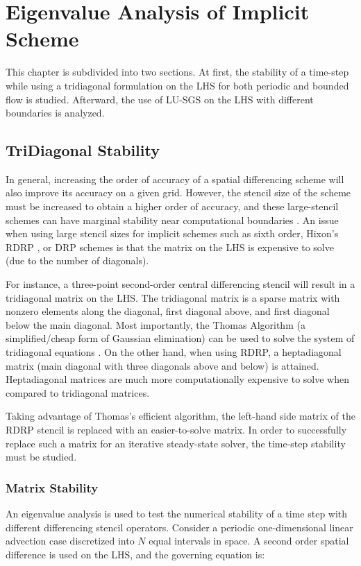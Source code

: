 \documentclass[conf]{new-aiaa}
\begin{document}
\section{Eigenvalue Analysis of Implicit Scheme}
\label{sec:Eigenvalue}
This chapter is subdivided into two sections. 
At first, the stability of a time-step while using a tridiagonal formulation on the LHS for both periodic and bounded flow is studied. 
Afterward, the use of LU-SGS on the LHS with different boundaries is analyzed. 

\subsection{TriDiagonal Stability}
\label{subsec:TriDi}
In general, increasing the order of accuracy of a spatial differencing scheme will also improve its accuracy on a given grid. 
However, the stencil size of the scheme must be increased to obtain a higher order of accuracy, and these large-stencil schemes can have marginal stability near computational boundaries \cite{RDRP}. 
An issue when using large stencil sizes for implicit schemes such as sixth order, Hixon's RDRP \cite{RDRP}, or DRP \cite{DRP} schemes is that the matrix on the LHS is expensive to solve (due to the number of diagonals). 

For instance, a three-point second-order central differencing stencil will result in a tridiagonal matrix on the LHS. 
The tridiagonal matrix is a sparse matrix with nonzero elements along the diagonal, first diagonal above, and first diagonal below the main diagonal. 
Most importantly, the Thomas Algorithm (a simplified/cheap form of Gaussian elimination) can be used to solve the system of tridiagonal equations \cite{Thomas_Algo}. 
On the other hand, when using RDRP, a heptadiagonal matrix (main diagonal with three diagonals above and below) is attained. 
Heptadiagonal matrices are much more computationally expensive to solve when compared to tridiagonal matrices. 

Taking advantage of Thomas's efficient algorithm, the left-hand side matrix of the RDRP stencil is replaced with an easier-to-solve matrix. 
In order to successfully replace such a matrix for an iterative steady-state solver, the time-step stability must be studied. 


\subsubsection{Matrix Stability}
An eigenvalue analysis is used to test the numerical stability of a time step with different differencing stencil operators. 
Consider a periodic one-dimensional linear advection case discretized into $N$ equal intervals in space. 
A second order spatial difference is used on the LHS, and the governing equation is:
\end{document}
